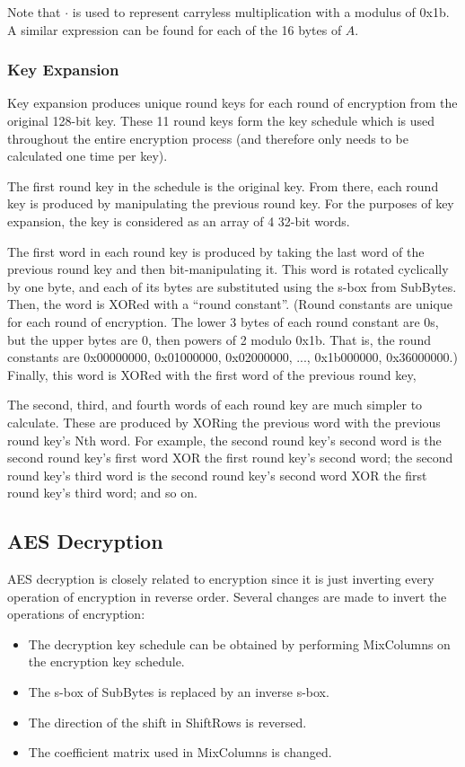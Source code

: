 \documentclass[a4paper,10pt]{article}
\begin{document}
Note that $\cdot$ is used to represent carryless multiplication with a modulus of 0x1b.  A similar expression can be found for each of the 16 bytes of $A$.

\subsubsection{Key Expansion}

Key expansion produces unique round keys for each round of encryption from the original 128-bit key.  These 11  round keys form the key schedule which is used throughout the entire encryption process (and therefore only needs to be calculated one time per key).

The first round key in the schedule is the original key.  From there, each round key is produced by manipulating the previous round key.  For the purposes of key expansion, the key is considered as an array of 4 32-bit words.

The first word in each round key is produced by taking the last word of the previous round key and then bit-manipulating it.  This word is rotated cyclically by one byte, and each of its bytes are substituted using the s-box from SubBytes.  Then, the word is XORed with a ``round constant''.  (Round constants are unique for each round of encryption.  The lower 3 bytes of each round constant are 0s, but the upper bytes are 0, then powers of 2 modulo 0x1b.  That is, the round constants are 0x00000000, 0x01000000, 0x02000000, ..., 0x1b000000, 0x36000000.)  Finally, this word is XORed with the first word of the previous round key,

The second, third, and fourth words of each round key are much simpler to calculate.  These are produced by XORing the previous word with the previous round key's Nth word.  For example, the second round key's second word is the second round key's first word XOR the first round key's second word; the second round key's third word is the second round key's second word XOR the first round key's third word; and so on.

\subsection{AES Decryption}

AES decryption is closely related to encryption since it is just inverting every operation of encryption in reverse order.  Several changes are made to invert the operations of encryption:

\begin{itemize}
 \item The decryption key schedule can be obtained by performing MixColumns on the encryption key schedule.
 \item The s-box of SubBytes is replaced by an inverse s-box.
 \item The direction of the shift in ShiftRows is reversed.
 \item The coefficient matrix used in MixColumns is changed. 
\end{itemize}
\end{document}
